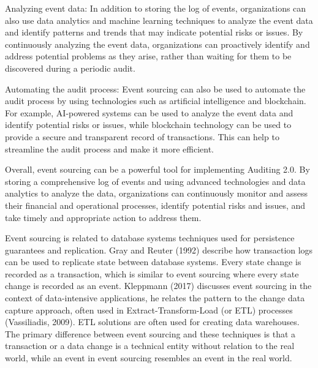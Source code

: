 Analyzing event data: In addition to storing the log of events, organizations can also use data analytics and machine learning techniques to analyze the event data and identify patterns and trends that may indicate potential risks or issues. By continuously analyzing the event data, organizations can proactively identify and address potential problems as they arise, rather than waiting for them to be discovered during a periodic audit.

Automating the audit process: Event sourcing can also be used to automate the audit process by using technologies such as artificial intelligence and blockchain. For example, AI-powered systems can be used to analyze the event data and identify potential risks or issues, while blockchain technology can be used to provide a secure and transparent record of transactions. This can help to streamline the audit process and make it more efficient.

Overall, event sourcing can be a powerful tool for implementing Auditing 2.0. By storing a comprehensive log of events and using advanced technologies and data analytics to analyze the data, organizations can continuously monitor and assess their financial and operational processes, identify potential risks and issues, and take timely and appropriate action to address them.

Event sourcing is related to database systems techniques used for persistence guarantees and replication. Gray and Reuter (1992) describe how transaction logs can be used to replicate state between database systems. Every state change is recorded as a transaction, which is similar to event sourcing where every state change is recorded as an event. Kleppmann (2017) discusses event sourcing in the context of data-intensive applications, he relates the pattern to the change data capture approach, often used in Extract-Transform-Load (or ETL) processes (Vassiliadis, 2009). ETL solutions are often used for creating data warehouses. The primary difference between event sourcing and these techniques is that a transaction or a data change is a technical entity without relation to the real world, while an event in event sourcing resembles an event in the real world.